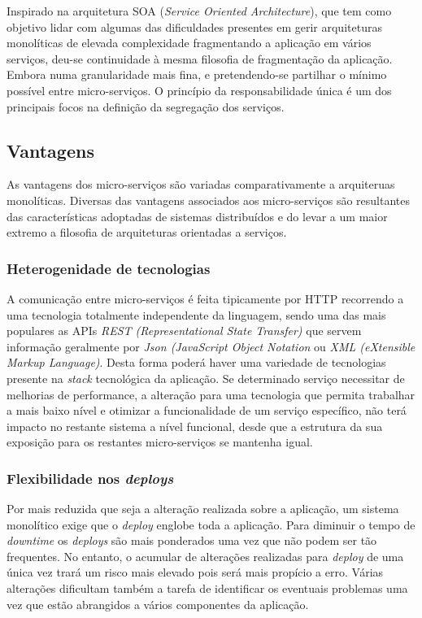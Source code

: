     Inspirado na arquitetura SOA (\textit{Service Oriented Architecture}), que tem como objetivo lidar com algumas das dificuldades presentes em gerir arquiteturas monolíticas de elevada complexidade fragmentando a aplicação em vários serviços, deu-se continuidade à mesma filosofia de fragmentação da aplicação. Embora numa granularidade mais fina,  e pretendendo-se partilhar o mínimo possível entre micro-serviços. O princípio da responsabilidade única é um dos principais focos na definição da segregação dos serviços.
    
    
    \subsection{Vantagens}
    
        As vantagens dos micro-serviços são variadas comparativamente a arquiteruas monolíticas. Diversas das vantagens associados aos micro-serviços são resultantes das características adoptadas de sistemas distribuídos e do levar a um maior extremo a filosofia de arquiteturas orientadas a serviços. 
    
    \subsubsection*{Heterogenidade de tecnologias}
    
        A comunicação entre micro-serviços é feita tipicamente por HTTP recorrendo a uma tecnologia totalmente independente da linguagem, sendo uma das mais populares as APIs \textit{REST (Representational State Transfer)} que servem informação geralmente por \textit{Json (JavaScript Object Notation} ou \textit{XML (eXtensible Markup Language)}. Desta forma poderá haver uma variedade de tecnologias presente na \textit{stack} tecnológica da aplicação. Se determinado serviço necessitar de melhorias de performance, a alteração para uma tecnologia que permita trabalhar a mais baixo nível e otimizar a funcionalidade de um serviço específico, não terá impacto no restante sistema a nível funcional, desde que a estrutura da sua exposição para os restantes micro-serviços se mantenha igual. 
    
    \subsubsection*{Flexibilidade nos \textit{deploys}}
    
        Por mais reduzida que seja a alteração realizada sobre a aplicação, um sistema monolítico exige que o \textit{deploy} englobe toda a aplicação. Para diminuir o tempo de \textit{downtime} os \textit{deploys} são mais ponderados uma vez que não podem ser tão frequentes. No entanto, o acumular de alterações realizadas para \textit{deploy} de uma única vez trará um risco mais elevado pois será mais propício a erro. Várias alterações dificultam também a tarefa de identificar os eventuais problemas uma vez que estão abrangidos a vários componentes da aplicação.
    
